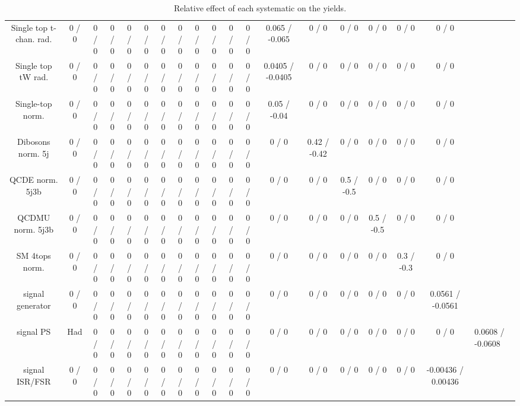 \documentclass[10pt]{article}
\begin{document}
\begin{table}[htbp]
\begin{center}
\begin{tabular}{|c|c|c|c|c|c|c|c|c|c|c|c|c|c|c|c|c|c|}
  Single top t-chan. rad. & 0 / 0 & 0 / 0 & 0 / 0 & 0 / 0 & 0 / 0 & 0 / 0 & 0 / 0 & 0 / 0 & 0 / 0 & 0 / 0 & 0 / 0 & 0.065 / -0.065 & 0 / 0 & 0 / 0 & 0 / 0 & 0 / 0 & 0 / 0 \\ 
  Single top tW rad. & 0 / 0 & 0 / 0 & 0 / 0 & 0 / 0 & 0 / 0 & 0 / 0 & 0 / 0 & 0 / 0 & 0 / 0 & 0 / 0 & 0 / 0 & 0.0405 / -0.0405 & 0 / 0 & 0 / 0 & 0 / 0 & 0 / 0 & 0 / 0 \\ 
  Single-top norm. & 0 / 0 & 0 / 0 & 0 / 0 & 0 / 0 & 0 / 0 & 0 / 0 & 0 / 0 & 0 / 0 & 0 / 0 & 0 / 0 & 0 / 0 & 0.05 / -0.04 & 0 / 0 & 0 / 0 & 0 / 0 & 0 / 0 & 0 / 0 \\ 
  Dibosons norm. 5j & 0 / 0 & 0 / 0 & 0 / 0 & 0 / 0 & 0 / 0 & 0 / 0 & 0 / 0 & 0 / 0 & 0 / 0 & 0 / 0 & 0 / 0 & 0 / 0 & 0.42 / -0.42 & 0 / 0 & 0 / 0 & 0 / 0 & 0 / 0 \\ 
  QCDE norm. 5j3b & 0 / 0 & 0 / 0 & 0 / 0 & 0 / 0 & 0 / 0 & 0 / 0 & 0 / 0 & 0 / 0 & 0 / 0 & 0 / 0 & 0 / 0 & 0 / 0 & 0 / 0 & 0.5 / -0.5 & 0 / 0 & 0 / 0 & 0 / 0 \\ 
  QCDMU norm. 5j3b & 0 / 0 & 0 / 0 & 0 / 0 & 0 / 0 & 0 / 0 & 0 / 0 & 0 / 0 & 0 / 0 & 0 / 0 & 0 / 0 & 0 / 0 & 0 / 0 & 0 / 0 & 0 / 0 & 0.5 / -0.5 & 0 / 0 & 0 / 0 \\ 
  SM 4tops norm. & 0 / 0 & 0 / 0 & 0 / 0 & 0 / 0 & 0 / 0 & 0 / 0 & 0 / 0 & 0 / 0 & 0 / 0 & 0 / 0 & 0 / 0 & 0 / 0 & 0 / 0 & 0 / 0 & 0 / 0 & 0.3 / -0.3 & 0 / 0 \\ 
  signal generator & 0 / 0 & 0 / 0 & 0 / 0 & 0 / 0 & 0 / 0 & 0 / 0 & 0 / 0 & 0 / 0 & 0 / 0 & 0 / 0 & 0 / 0 & 0 / 0 & 0 / 0 & 0 / 0 & 0 / 0 & 0 / 0 & 0.0561 / -0.0561 \\ 
  signal PS & Had & 0 / 0 & 0 / 0 & 0 / 0 & 0 / 0 & 0 / 0 & 0 / 0 & 0 / 0 & 0 / 0 & 0 / 0 & 0 / 0 & 0 / 0 & 0 / 0 & 0 / 0 & 0 / 0 & 0 / 0 & 0 / 0 & 0.0608 / -0.0608 \\ 
  signal ISR/FSR & 0 / 0 & 0 / 0 & 0 / 0 & 0 / 0 & 0 / 0 & 0 / 0 & 0 / 0 & 0 / 0 & 0 / 0 & 0 / 0 & 0 / 0 & 0 / 0 & 0 / 0 & 0 / 0 & 0 / 0 & 0 / 0 & -0.00436 / 0.00436 \\ 
\hline 
\end{tabular} 
\caption{Relative effect of each systematic on the yields.} 
\end{center} 
\end{table} 
\end{document}
